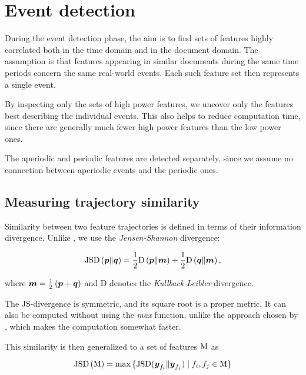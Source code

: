 \section{Event detection}

During the event detection phase, the aim is to find sets of features highly correlated both in the time domain and in the document domain. The assumption is that features appearing in similar documents during the same time periods concern the same real-world events. Each such feature set then represents a single event.

By inspecting only the sets of high power features, we uncover only the features best describing the individual events. This also helps to reduce computation time, since there are generally much fewer high power features than the low power ones.

The aperiodic and periodic features are detected separately, since we assume no connection between aperiodic events and the periodic ones.


\subsection{Measuring trajectory similarity}

Similarity between two feature trajectories is defined in terms of their information divergence. Unlike \cite{event-detection}, we use the \textit{Jensen-Shannon} divergence:

\begin{equation*}
	\featsim \left( \vect{p} \| \vect{q} \right) = \frac{1}{2} \text{D} \left( \vect{p} \| \vect{m} \right) + \frac{1}{2} \text{D} \left( \vect{q} \| \vect{m} \right),
\end{equation*}

where $\vect{m} = \frac{1}{2} \left( \vect{p} + \vect{q} \right)$ and D denotes the \textit{Kullback-Leibler} divergence.

The JS-divergence is symmetric, and its square root is a proper metric. It can also be computed without using the \textit{max} function, unlike the approach chosen by \cite{event-detection}, which makes the computation somewhat faster.

This similarity is then generalized to a set of features $\text{M}$ as

\begin{equation}
	\featsim \left( \featset \right) = \max{ \{ \featsim ( \vect{y}_{f_{i}} \| \vect{y}_{f_{j}} ) \mid f_{i}, f_{j} \in \featset \} }
\end{equation}

